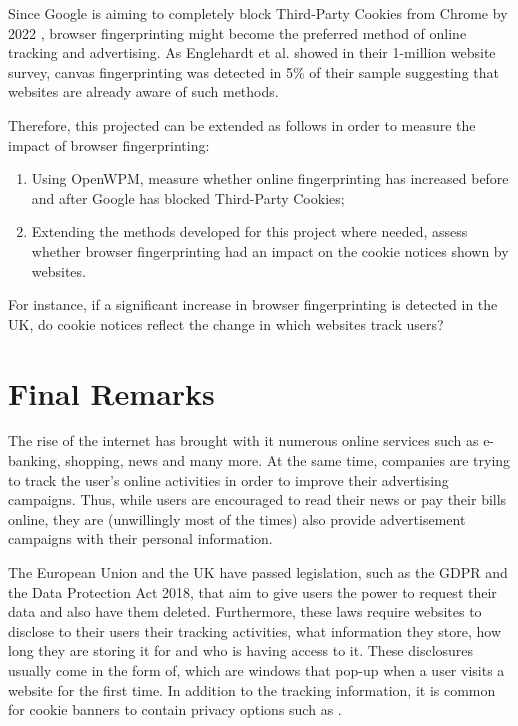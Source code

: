 \documentclass[../main.tex]{subfiles}
\begin{document}
Since Google is aiming to completely block Third-Party Cookies from Chrome by 2022 \cite{bohn_2020}, browser fingerprinting might become the preferred method of online tracking and advertising. As Englehardt et al. \cite{englehardt2016online} showed in their 1-million website survey, canvas fingerprinting was detected in 5\% of their sample suggesting that websites are already aware of such methods. 

Therefore, this projected can be extended as follows in order to measure the impact of browser fingerprinting:

\begin{enumerate}
    \item Using OpenWPM, measure whether online fingerprinting has increased before and after Google has blocked Third-Party Cookies;

    \item Extending the methods developed for this project where needed, assess whether browser fingerprinting had an impact on the cookie notices shown by websites.
\end{enumerate}

For instance, if a significant increase in browser fingerprinting is detected in the UK, do cookie notices reflect the change in which websites track users? 

\section{Final Remarks}
The rise of the internet has brought with it numerous online services such as e-banking, shopping, news and many more. At the same time, companies are trying to track the user’s online activities in order to improve their advertising campaigns. Thus, while users are encouraged to read their news or pay their bills online, they are (unwillingly most of the times) also provide advertisement campaigns with their personal information. 

The European Union and the UK have passed legislation, such as the GDPR and the Data Protection Act 2018, that aim to give users the power to request their data and also have them deleted. Furthermore, these laws require websites to disclose to their users their tracking activities, what information they store, how long they are storing it for and who is having access to it. These disclosures usually come in the form of, which are windows that pop-up when a user visits a website for the first time. In addition to the tracking information, it is common for cookie banners to contain privacy options such as . 
\end{document}
